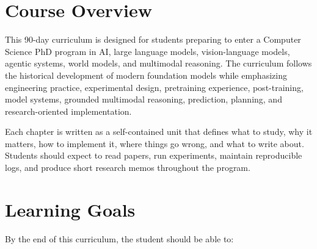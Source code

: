 \chapter*{Course Overview}

This 90-day curriculum is designed for students preparing to enter a Computer Science PhD program in AI, large language models, vision-language models, agentic systems, world models, and multimodal reasoning. The curriculum follows the historical development of modern foundation models while emphasizing engineering practice, experimental design, pretraining experience, post-training, model systems, grounded multimodal reasoning, prediction, planning, and research-oriented implementation.

Each chapter is written as a self-contained unit that defines what to study, why it matters, how to implement it, where things go wrong, and what to write about. Students should expect to read papers, run experiments, maintain reproducible logs, and produce short research memos throughout the program.

\chapter*{Learning Goals}

By the end of this curriculum, the student should be able to:

